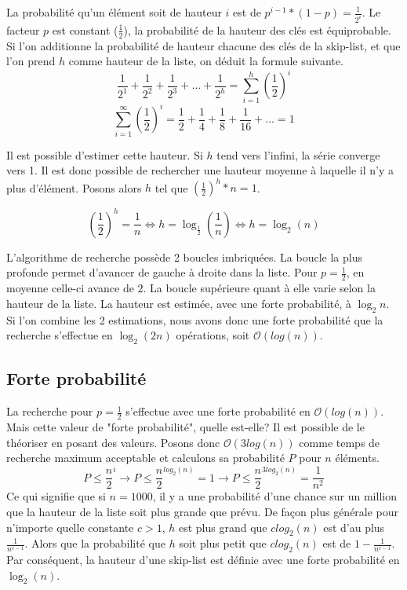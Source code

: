 \documentclass[hidelinks,a4paper, 12pt]{article}
\begin{document}
	\newpage
	La probabilité qu'un élément soit de hauteur $i$ est de ${p^{i-1}*(1-p)} = \frac{1}{2^{i}} $. Le facteur $p$ est constant ($\frac{1}{2}$), la probabilité de la hauteur des clés est équiprobable. Si l'on additionne la probabilité de hauteur chacune des clés de la skip-list, et que l'on prend $h$ comme hauteur de la liste, on déduit la formule suivante.
	\[
		\frac{1}{{2}^{1}}+\frac{1}{{2}^{2}}+\frac{1}{{2}^{3}}+\dots+\frac{1}{{2}^{h}}
		= \sum _{i=1}^{h} ({\frac{1}{2}})^{i}
	\]
	\[
		\sum _{i=1}^{\infty} ({\frac{1}{2}})^{i} = \frac{1}{2} + \frac{1}{4} + \frac{1}{8} + \frac{1}{16} + ... = 1
	\]
	
	Il est possible d'estimer cette hauteur. Si $h$ tend vers l'infini, la série converge vers 1. Il est donc possible de rechercher une hauteur moyenne à laquelle il n'y a plus d'élément. Posons alors $h$ tel que ${(\frac{1}{2})}^h*n = 1$. 

	\[
		{(\frac{1}{2})}^{h}=\frac{1}{n}
		\iff h = \log_{\frac{1}{2}}(\frac{1}{n})
		\iff h = \log_{2}(n)
	\]
	
	L'algorithme de recherche possède 2 boucles imbriquées. La boucle la plus profonde permet d'avancer de gauche à droite dans la liste. Pour $p=\frac{1}{2}$, en moyenne celle-ci avance de $2$. La boucle supérieure quant à elle varie selon la hauteur de la liste. La hauteur est estimée, avec une forte probabilité, à $\log_{2} n $. Si l'on combine les 2 estimations, nous avons donc une forte probabilité que la recherche s'effectue en $\log_{2}( 2n )$ opérations, soit $\mathcal{O}(log(n))$.
	
	\subsection{Forte probabilité}
	La recherche pour $p=\frac{1}{2}$ s'effectue avec une forte probabilité en $\mathcal{O}(log(n))$. Mais cette valeur de "forte probabilité", quelle est-elle? Il est possible de le théoriser en posant des valeurs. Posons donc $\mathcal{O}(3log(n))$ comme temps de recherche maximum acceptable et calculons sa probabilité $P$ pour $n$ éléments.
	\[
		P \le {\frac{n}{2}}^{i}
		\longrightarrow P \le {\frac{n}{2}}^{log_2(n)} = 1
		\longrightarrow P \le {\frac{n}{2}}^{3log_2(n)} = \frac{1}{n^2}
	\]
	Ce qui signifie que si $n=1000$, il y a une probabilité d'une chance sur un million que la hauteur de la liste soit plus grande que prévu. De façon plus générale pour n'importe quelle constante $c>1$, $h$ est plus grand que $c log_2(n)$ est d'au plus $\frac{1}{n^{c-1}}$. Alors que la probabilité que  $h$ soit plus petit que $c log_2(n)$ est de $1-\frac{1}{n^{c-1}}$. Par conséquent, la hauteur d'une skip-list est définie avec une forte probabilité en $\log_{2}(n)$.
	
\end{document}

